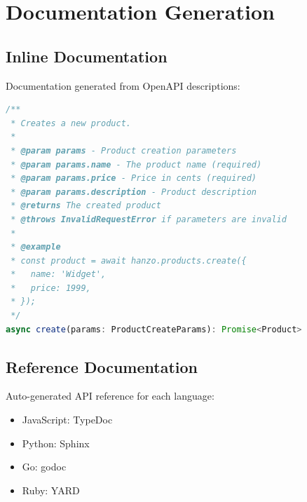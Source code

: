\section{Documentation Generation}


\subsection{Inline Documentation}

Documentation generated from OpenAPI descriptions:

\begin{lstlisting}[language=JavaScript, caption=Generated Documentation]
/**
 * Creates a new product.
 *
 * @param params - Product creation parameters
 * @param params.name - The product name (required)
 * @param params.price - Price in cents (required)
 * @param params.description - Product description
 * @returns The created product
 * @throws InvalidRequestError if parameters are invalid
 *
 * @example
 * const product = await hanzo.products.create({
 *   name: 'Widget',
 *   price: 1999,
 * });
 */
async create(params: ProductCreateParams): Promise<Product>
\end{lstlisting}

\subsection{Reference Documentation}

Auto-generated API reference for each language:

\begin{itemize}
    \item JavaScript: TypeDoc
    \item Python: Sphinx
    \item Go: godoc
    \item Ruby: YARD
\end{itemize}

